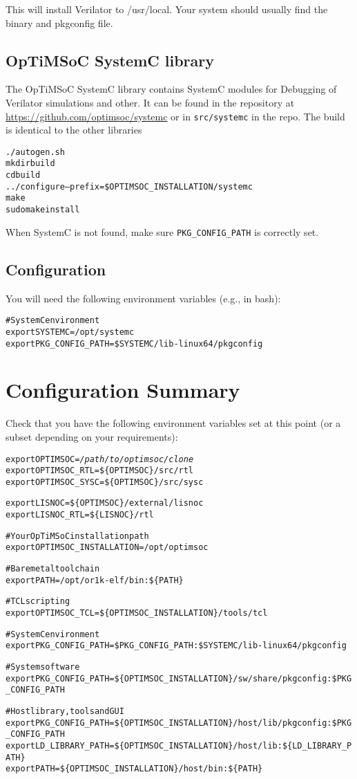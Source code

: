 This will install Verilator to /usr/local. Your system should usually
find the binary and pkgconfig file.

\subsection{OpTiMSoC SystemC library}

The OpTiMSoC SystemC library contains SystemC modules for Debugging of
Verilator simulations and other. It can be found in the repository at
\url{https://github.com/optimsoc/systemc} or in \texttt{src/systemc}
in the repo. The build is identical to the other libraries

\begin{alltt}
./autogen.sh
mkdir build
cd build
../configure --prefix=\$OPTIMSOC_INSTALLATION/systemc
make
sudo make install
\end{alltt}

When SystemC is not found, make sure \verb|PKG_CONFIG_PATH| is
correctly set.

\subsection{Configuration}

You will need the following environment variables (e.g., in bash):

\begin{alltt}
# SystemC environment
export SYSTEMC=/opt/systemc
export PKG_CONFIG_PATH=\$SYSTEMC/lib-linux64/pkgconfig
\end{alltt}

\section{Configuration Summary}

Check that you have the following environment variables set at this
point (or a subset depending on your requirements):

\begin{alltt}
export OPTIMSOC=\emph{/path/to/optimsoc/clone}
export OPTIMSOC_RTL=\$\{OPTIMSOC\}/src/rtl
export OPTIMSOC_SYSC=\$\{OPTIMSOC\}/src/sysc

export LISNOC=\$\{OPTIMSOC\}/external/lisnoc
export LISNOC_RTL=\$\{LISNOC\}/rtl

# Your OpTiMSoC installation path
export OPTIMSOC_INSTALLATION=/opt/optimsoc

# Baremetal toolchain
export PATH=/opt/or1k-elf/bin:\$\{PATH\}

# TCL scripting
export OPTIMSOC_TCL=\$\{OPTIMSOC_INSTALLATION\}/tools/tcl

# SystemC environment
export PKG_CONFIG_PATH=\$PKG_CONFIG_PATH:\$SYSTEMC/lib-linux64/pkgconfig

# System software
export PKG_CONFIG_PATH=\$\{OPTIMSOC_INSTALLATION\}/sw/share/pkgconfig:\$PKG_CONFIG_PATH

# Host library, tools and GUI
export PKG_CONFIG_PATH=\$\{OPTIMSOC_INSTALLATION\}/host/lib/pkgconfig:\$PKG_CONFIG_PATH
export LD_LIBRARY_PATH=\$\{OPTIMSOC_INSTALLATION\}/host/lib:\$\{LD_LIBRARY_PATH\}
export PATH=\$\{OPTIMSOC_INSTALLATION\}/host/bin:\$\{PATH\}
\end{alltt}

